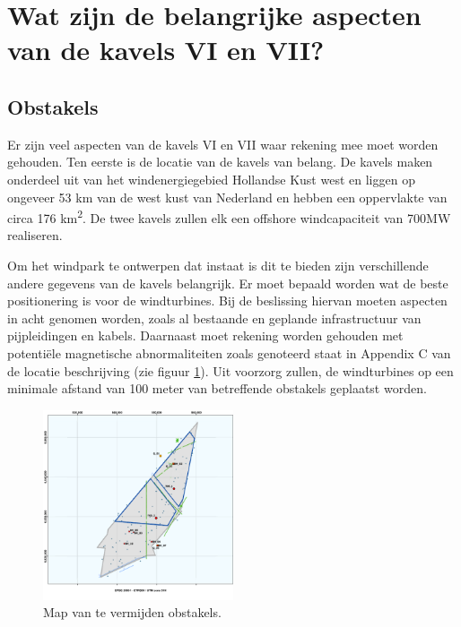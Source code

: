 \section{Wat zijn de belangrijke aspecten van de kavels VI en VII?} \label{Wat zijn de belangrijke aspecten van de Kavels VI en VII?}

\subsection{Obstakels}
Er zijn veel aspecten van de kavels VI en VII waar rekening mee moet worden gehouden. Ten eerste is de locatie van de kavels van belang. De kavels maken onderdeel uit van het windenergiegebied Hollandse Kust west en liggen op ongeveer 53 km van de west kust van Nederland en hebben een oppervlakte van circa 176 km\textsuperscript{2}.\cite{SiteDescriptionRVO} De twee kavels zullen elk een offshore windcapaciteit van 700MW realiseren.\cite{SiteDescriptionRVO}\cite{Functies&gebruikHKW}

Om het windpark te ontwerpen dat instaat is dit te bieden zijn verschillende andere gegevens van de kavels belangrijk. Er moet bepaald worden wat de beste positionering is voor de windturbines. Bij de beslissing hiervan moeten aspecten in acht genomen worden, zoals al bestaande en geplande infrastructuur van pijpleidingen en kabels. Daarnaast moet rekening worden gehouden met potentiële magnetische abnormaliteiten zoals genoteerd staat in Appendix C van de locatie beschrijving (zie figuur \ref{fig:obstakels}).\cite{SiteDescriptionRVO}\cite{AppendixC} Uit voorzorg zullen, de windturbines op een minimale afstand van 100 meter van betreffende obstakels geplaatst worden.
\begin{figure}[h]
\centering
\includegraphics[width=0.5\textwidth]{IMG/data/overzicht/Map_obstakels.png} 
\caption{Map van te vermijden obstakels.}
\label{fig:obstakels}
\end{figure}

